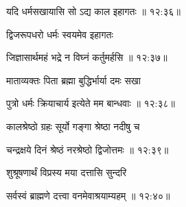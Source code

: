 {\devanagarifont यदि धर्मसखायासि सो ऽद्य काल इहागतः {॥ १२:३६॥} \veg\dontdisplaylinenum }%

{\devanagarifont द्विजरूपधरो धर्मः स्वयमेव इहागतः \thinspace{\dandab} \dontdisplaylinenum }%


{\devanagarifont जिज्ञासार्थमहं भद्रे न विघ्नं कर्तुमर्हसि {॥ १२:३७॥} \veg\dontdisplaylinenum }%

{\devanagarifont माताव्यक्तः पिता ब्रह्मा बुद्धिर्भार्या दमः सखा \thinspace{\dandab} \dontdisplaylinenum }%


{\devanagarifont पुत्रो धर्मः क्रियाचार्य इत्येते मम बान्धवाः {॥ १२:३८॥} \veg\dontdisplaylinenum }%
 
{\devanagarifont कालश्रेष्ठो ग्रहः सूर्यो गङ्गा श्रेष्ठा नदीषु च \thinspace{\dandab} \dontdisplaylinenum }%


{\devanagarifont चन्द्रक्षये दिनं श्रेष्ठं नरश्रेष्ठो द्विजोत्तमः {॥ १२:३९॥} \veg\dontdisplaylinenum }%

{\devanagarifont शुश्रूषणार्थं विप्रस्य मया दत्तासि सुन्दरि \thinspace{\dandab} \dontdisplaylinenum }%


{\devanagarifont सर्वस्वं ब्राह्मणे दत्त्वा वनमेवाश्रयाम्यहम् {॥ १२:४०॥} \veg\dontdisplaylinenum }%
 
